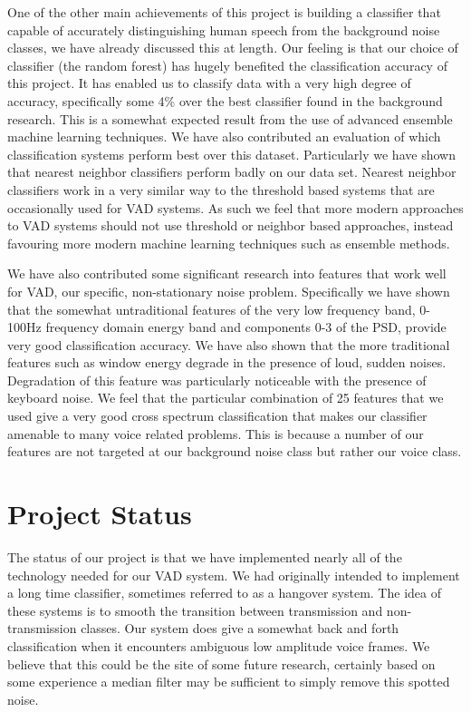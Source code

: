 \documentclass[ %
                    author={Sam Phippen},
                supervisor={Dr. Rafal Bogacz},
                     title={Real time voice activity detectors in noisy personal computing environments},
                  subtitle={},
                    degree={MEng},
                      year={2012} ]{thesis}
\begin{document}
One of the other main achievements of this project is building a classifier
that capable of accurately distinguishing human speech from the background
noise classes, we have already discussed this at length. Our feeling is that
our choice of classifier (the random forest) has hugely benefited the
classification accuracy of this project. It has enabled us to classify data
with a very high degree of accuracy, specifically some 4\% over the best
classifier found in the background research\cite{shin}. This is a somewhat
expected result from the use of advanced ensemble machine learning techniques.
We have also contributed an evaluation of which classification systems perform
best over this dataset. Particularly we have shown that nearest neighbor
classifiers perform badly on our data set. Nearest neighbor classifiers work in
a very similar way to the threshold based systems that are occasionally used
for VAD systems. As such we feel that more modern approaches to VAD systems
should not use threshold or neighbor based approaches, instead favouring more
modern machine learning techniques such as ensemble methods.

We have also contributed some significant research into features that work well
for VAD, our specific, non-stationary noise problem. Specifically we have shown
that the somewhat untraditional features of the very low frequency band,
0-100Hz frequency domain energy band and components 0-3 of the PSD, provide
very good classification accuracy. We have also shown that the more traditional
features such as window energy degrade in the presence of loud, sudden noises.
Degradation of this feature was particularly noticeable with the presence of
keyboard noise. We feel that the particular combination of 25 features that we
used give a very good cross spectrum classification that makes our classifier
amenable to many voice related problems. This is because a number of our
features are not targeted at our background noise class but rather our voice
class.

\section{Project Status}

The status of our project is that we have implemented nearly all of the
technology needed for our VAD system. We had originally intended to implement a
long time classifier, sometimes referred to as a hangover system. The idea of
these systems is to smooth the transition between transmission and
non-transmission classes. Our system does give a somewhat back and forth
classification when it encounters ambiguous low amplitude voice frames. We
believe that this could be the site of some future research, certainly based on
some experience a median filter may be sufficient to simply remove this spotted
noise.
\end{document}
